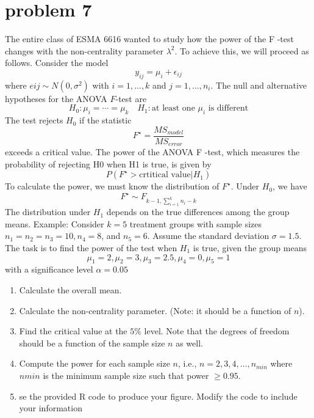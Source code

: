 \documentclass{article}
\begin{document}
\section{problem 7}
The entire class of ESMA 6616 wanted to study how the power of the F -test changes with the
non-centrality parameter $\lambda^2$. To achieve this, we will proceed as follows. Consider the model
$$
	y_{ij}= \mu_i + \epsilon_{ij}
$$
where $e{ij} \sim N(0,\sigma^2)$ with $i=1,\ldots,k$ and $j=1,\ldots,n_i$.
The null and alternative hypotheses for the ANOVA $F$-test are
$$
	H_0:\mu_i=\cdots=\mu_k \quad H_1: \text{at least one  $\mu_i$ is different}
$$
The test rejects $H_0$ if the statistic
$$
	F^\star = \frac{MS_{model}}{MS_{error}}
$$
exceeds a critical value.
The power of the ANOVA F -test, which measures the probability of rejecting H0 when H1 is true,
is given by
$$
	P(F^\star>\text{crtitical value}| H_1)
$$
To calculate the power, we must know the distribution of $F^\star$. Under $H_0$, we have
$$
	F^\star \sim F_{k-1,\sum_{i=1}^{k}n_i-k}
$$
The distribution under $H_1$ depends on the true differences among the group means.
Example: Consider $k = 5$ treatment groups with sample sizes $n_1 = n_2 = n_3 = 10, n_4 = 8$, and
$n_5 = 6$. Assume the standard deviation $\sigma = 1.5$. The task is to find the power of the test when $H_1$
is true, given the group means
$$
	\mu_1 = 2, \mu_2 = 3, \mu_3 = 2.5, \mu_4 =0, \mu_5 = 1
$$
with a significance level $\alpha = 0.05$
\begin{enumerate}
	\item Calculate the overall mean.
	\item Calculate the non-centrality parameter. (Note: it should be a function of $n$).
	\item Find the critical value at the $5\%$ level. Note that the degrees of freedom should be a function of the
	      sample size $n$ as well.
	\item Compute the power for each sample size $n$, i.e., $n=2,3,4,\ldots,n_{min}$
	      where $n{min}$ is the minimum sample size such that power $\ge 0.95$.
	\item se the provided R code to produce your figure. Modify the code to include your information
\end{enumerate}
\end{document}
